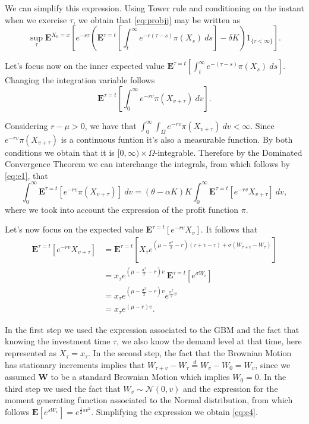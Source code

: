 We can simplify this expression. Using Tower rule and conditioning on the instant when we exercise $\tau$, we obtain that \eqref{eq:probjj} may be written as
\begin{equation}
\sup_\tau \textbf{E}^{X_0=x}\left[ e^{- r\tau} \left( \textbf{E}^{\tau=t}\left[  \int_t^\infty e^{-r(\tau-s) }\pi(X_s)\ ds  \right] -\delta K\right) 1_{\{\tau<\infty\}} \right].
\label{eq:prob2}
\end{equation}

Let's focus now on the inner expected value $\textbf{E}^{\tau=t}\left[  \int_t^\infty e^{-(\tau-s) }\pi(X_s) \ ds  \right]$. Changing the integration variable follows
\begin{equation}
\textbf{E}^{\tau=t}\left[  \int_0^\infty e^{-rv }\pi(X_{v+\tau})\ dv  \right].
\label{eq:e1}
\end{equation}

Considering $r-\mu>0$, we have that $ \int_0^\infty \int_\Omega    e^{-rv }\pi(X_{v+\tau}) \ dv < \infty$. Since $e^{-rv }\pi(X_{v+\tau})$ is a continuous funtion it's also a measurable function. By both conditions we obtain that it is $[0,\infty) \times \Omega$-integrable. Therefore by the Dominated Convergence Theorem we can interchange the integrals, from which follows by \eqref{eq:e1}, that
\begin{equation}
\int_0^\infty\textbf{E}^{\tau=t}\left[   e^{-rv }\pi(X_{v+\tau}) \right]\ dv
= (\theta-\alpha K)K \int_0^\infty\textbf{E}^{\tau=t}\left[   e^{-rv } X_{v+\tau} \right]\ dv,
\label{eq:e2}
\end{equation}
where we took into account the expression of the profit function $\pi$.


Let's now focus on the expected value $\textbf{E}^{\tau=t}\left[   e^{-rv }  X_{v} \right]$.
It follows that
\begin{align}
\textbf{E}^{\tau=t}\left[   e^{-rv } X_{v+\tau} \right] 
&= \textbf{E}^{\tau=t}\left[   X_\tau e^{\left(\mu- \frac{\sigma^2}{2}-r \right) (\tau+v-\tau) + \sigma (W_{\tau+v}-W_\tau)}\right] \nonumber \\
&=x_\tau e^{\left(\mu- \frac{\sigma^2}{2}-r \right) v} \ \textbf{E}^{\tau=t}\left[ e^{\sigma W_v} \right] \nonumber \\
&= x_\tau e^{\left(\mu- \frac{\sigma^2}{2}-r \right) v} e^{ \frac{\sigma^2}{2} v} \nonumber \\
&=x_\tau e^{(\mu-r)v}.
\label{eq:e4}
\end{align}


In the first step we used the expression associated to the GBM and the fact that knowing the investment time $\tau$, we also know the demand level at that time, here represented as $X_\tau=x_\tau$. In the second step, the fact that the Brownian Motion has stationary increments implies that $W_{\tau+v}-W_\tau \overset{d}{=} W_v -W_0 = W_v$, since we assumed \textbf{W} to be a standard Brownian Motion which implies $W_0=0$.
In the third step we used the fact that $ W_v \sim \mathcal{N}(0,v)$ and the expression for the moment generating function associated to the Normal distribution, from which follows $\textbf{E}\left[e^{sW_v}\right]=e^{\frac{1}{2} s v^2}$. Simplifying the expression we obtain \eqref{eq:e4}.

